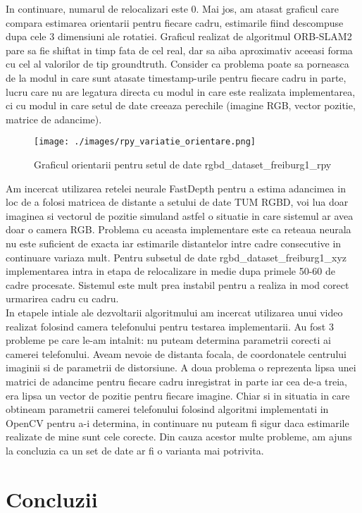 \documentclass[12pt,a4paper]{report}
\begin{document}
In continuare, numarul de relocalizari este 0. Mai jos, am atasat graficul care compara 
estimarea orientarii pentru fiecare cadru, estimarile fiind descompuse dupa cele 3 dimensiuni
ale rotatiei. Graficul realizat de algoritmul ORB-SLAM2 pare sa fie shiftat in timp fata 
de cel real, dar sa aiba aproximativ aceeasi forma cu cel al valorilor de tip groundtruth.
Consider ca problema poate sa porneasca de la modul in care sunt atasate timestamp-urile 
pentru fiecare cadru in parte, lucru care nu are legatura directa cu modul in care este
realizata implementarea, ci cu modul in care setul de date creeaza perechile (imagine RGB, 
vector pozitie, matrice de adancime).      
\begin{figure}[htbp] 
  \centering
  \texttt{[image: ./images/rpy\_variatie\_orientare.png]}
  \caption{Graficul orientarii pentru setul de date rgbd\_dataset\_freiburg1\_rpy}
  \label{fig:exemplu_imagine}
\end{figure}
Am incercat utilizarea retelei neurale FastDepth pentru a estima adancimea in loc de a
folosi matricea de distante a setului de date TUM RGBD, voi lua doar imaginea si vectorul 
de pozitie simuland astfel o situatie in care sistemul ar avea doar o camera RGB.
Problema cu aceasta implementare este ca reteaua neurala nu este suficient de exacta iar 
estimarile distantelor intre cadre consecutive in continuare variaza mult. Pentru 
subsetul de date rgbd\_dataset\_freiburg1\_xyz implementarea intra in etapa de relocalizare
in medie dupa primele 50{-}60 de cadre procesate. Sistemul este mult prea instabil pentru
a realiza in mod corect urmarirea cadru cu cadru. \\

In etapele intiale ale dezvoltarii algoritmului am incercat utilizarea unui video realizat 
folosind camera telefonului pentru testarea implementarii. Au fost 3 probleme pe care le-am 
intalnit: nu puteam determina parametrii corecti ai camerei telefonului. Aveam nevoie 
de distanta focala, de coordonatele centrului imaginii si de parametrii de distorsiune.
A doua problema o reprezenta lipsa unei matrici de adancime pentru fiecare cadru inregistrat
in parte iar cea de-a treia, era lipsa un vector de pozitie pentru fiecare imagine. Chiar 
si in situatia in care obtineam parametrii camerei telefonului folosind algoritmi implementati
in OpenCV pentru a-i determina, in continuare nu puteam fi sigur daca estimarile realizate 
de mine sunt cele corecte. Din cauza acestor multe probleme, am ajuns la concluzia ca un set 
de date ar fi o varianta mai potrivita.
\chapter{Concluzii}
\end{document}
